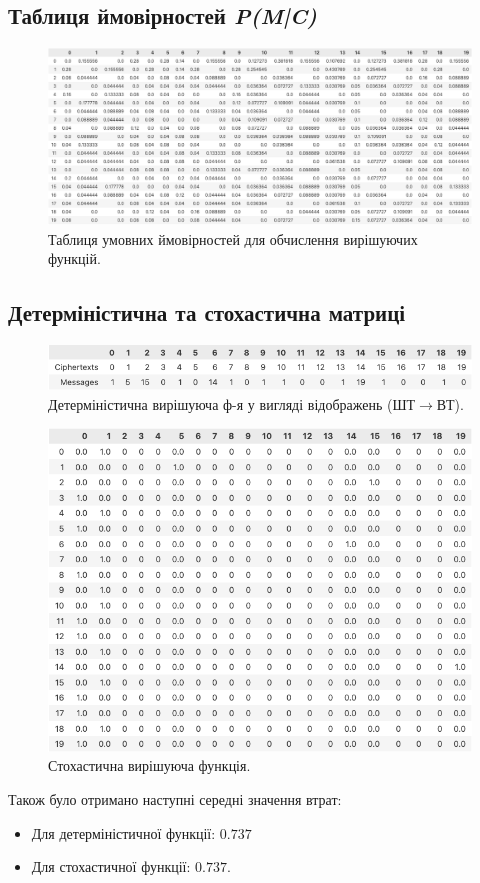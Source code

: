 \newpage
\subsection{Таблиця ймовірностей \textit{P(M|C)}}
\vspace{-1cm}
\begin{figure}[!h]
    \centering
    \includegraphics[scale = 0.42]{IMAGES/probabilityTable.png}
    \caption{\large Таблиця умовних ймовірностей для обчислення вирішуючих функцій.}
    \label{fig1}
\end{figure}
\vspace{-0.5cm}
\subsection{Детерміністична та стохастична матриці}
\vspace{-1cm}
\begin{figure}[!h]
    \centering
    \includegraphics[scale = 0.5]{IMAGES/deterministicMatrix.png}
    \caption{\large Детерміністична вирішуюча ф-я у вигляді відображень (ШТ$\rightarrow$ВТ).}
    \label{fig2}
\end{figure}

\vspace{-1cm}
\begin{figure}[!h]
    \centering
    \includegraphics[scale = 0.4]{IMAGES/stohasticMatrix.png}
    \caption{\large Стохастична вирішуюча функція.}
    \label{fig3}
\end{figure}

Також було отримано наступні середні значення втрат:
\begin{itemize}
    \item Для детерміністичної функції: $0.737$
    \item Для стохастичної функції: $0.737$.
\end{itemize}